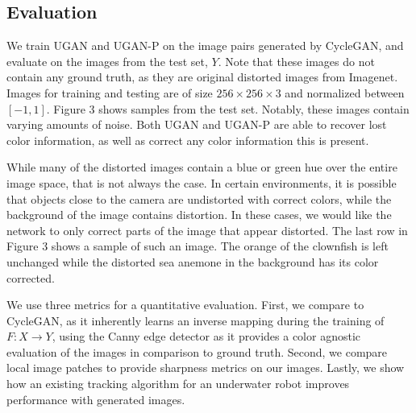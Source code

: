 \documentclass[letterpaper, 10pt, conference]{ieeeconf}
\begin{document}
\subsection{Evaluation}
We train UGAN and UGAN-P on the image pairs generated by CycleGAN, and evaluate on the images from the
test set, $Y$. Note that these images do not contain any ground truth, as they are original distorted images from
Imagenet. Images for training and testing are of size $256 \times 256 \times 3$ and normalized between $[-1, 1]$.
Figure 3 shows samples from the test set. Notably, these images contain varying amounts of noise. Both UGAN and UGAN-P
are able to recover lost color information, as well as correct any color information this is present. 

While many of the distorted images contain a blue or green hue over the entire image space, that is not always the case.
In certain environments,
it is possible that objects close to the camera are undistorted with correct colors, while the background
of the image contains distortion. In these cases, we would like the network to only correct parts of the image that
appear distorted. The last row in Figure 3 shows a sample of such an image. The orange of the clownfish is left
unchanged while the distorted sea anemone in the background has its color corrected.

We use three metrics for a quantitative evaluation. First, we compare to CycleGAN, as it inherently learns an inverse
mapping during the training of $F: X \rightarrow Y$, using the Canny edge detector
\cite{canny1986computational} as it provides a color agnostic evaluation of the images in comparison to ground truth.
Second, we compare local image patches to provide sharpness metrics on our images. Lastly, we show how an existing
tracking algorithm for an underwater robot improves performance with generated images.
\end{document}
